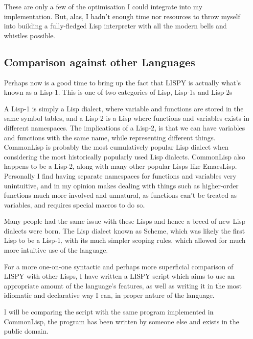 \documentclass{article}
\begin{document}
    These are only a few of the optimisation I could integrate into my
    implementation. But, alas, I hadn't enough time nor resources to throw
    myself into building a fully-fledged Lisp interpreter with all the modern
    bells and whistles possible.


  \subsection{Comparison against other Languages}
   Perhaps now is a good time to bring up the fact that LISPY is actually what's
   known as a Lisp-1. This is one of two categories of Lisp, Lisp-1s and Lisp-2s

   A Lisp-1 is simply a Lisp dialect, where variable and functions are stored in
   the same symbol tables, and a Lisp-2 is a Lisp where functions and variables
   exists in different namespaces.  The implications of a Lisp-2, is that we can
   have variables and functions with the same name, while representing different
   things. CommonLisp is probably the most cumulatively popular Lisp dialect
   when considering the most historically popularly used Lisp dialects. CommonLisp
   also happens to be a Lisp-2, along with many other popular Lisps like EmacsLisp.
   Personally I find having separate namespaces for functions and variables very
   unintuitive, and in my opinion makes dealing with things such as higher-order
   functions much more involved and unnatural, as functions can't be treated as
   variables, and requires special macros to do so.

   Many people had the same
   issue with these Lisps and hence a breed of new Lisp dialects were born.
   The Lisp dialect known as Scheme, which was likely the first Lisp to be a
   Lisp-1, with its much simpler scoping rules, which allowed for much more
   intuitive use of the language.

   For a more one-on-one syntactic and perhaps more superficial comparison of
   LISPY with other Lisps, I have written a LISPY script which aims to use
   an appropriate amount of the language's features, as well as writing it in
   the most idiomatic and declarative way I can, in proper nature of the language.

   I will be comparing the script with the same program implemented in
   CommonLisp, the program has been written by someone else and exists in the
   public domain.
\end{document}
